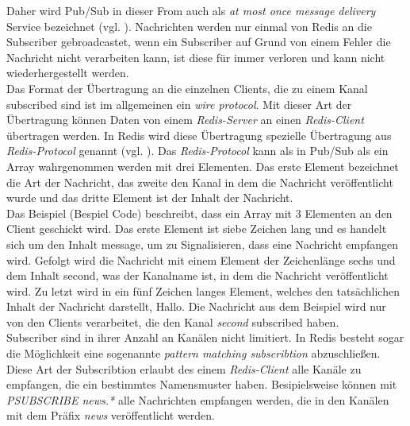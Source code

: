 Daher wird \acs{Pub/Sub} in dieser From auch als \textit{at most once message delivery} Service bezeichnet (vgl. \cite{Redis-PubSub}). Nachrichten werden nur einmal von \acs{Redis} an die Subscriber gebroadcastet, wenn ein Subscriber auf Grund von einem Fehler die Nachricht nicht verarbeiten kann, ist diese für immer verloren und kann nicht wiederhergestellt werden. 
\\
Das Format der Übertragung an die einzelnen Clients, die zu einem Kanal subscribed sind ist im allgemeinen ein \textit{wire protocol}. Mit dieser Art der Übertragung können Daten von einem \textit{Redis-Server} an einen \textit{Redis-Client} übertragen werden.
In \acs{Redis} wird diese Übertragung spezielle Übertragung aus \textit{Redis-Protocol} genannt (vgl. \cite{Redis-PubSub}).
Das \textit{Redis-Protocol} kann als in \acs{Pub/Sub} als ein Array wahrgenommen werden mit drei Elementen. Das erste Element bezeichnet die Art der Nachricht, das zweite den Kanal in dem die Nachricht veröffentlicht wurde und das dritte Element ist der Inhalt der Nachricht. 
\\
Das Beispiel (Bespiel Code) beschreibt, dass ein Array mit 3 Elementen an den Client geschickt wird. Das erste Element ist siebe Zeichen lang und es handelt sich um den Inhalt message, um zu Signalisieren, dass eine Nachricht empfangen wird. Gefolgt wird die Nachricht mit einem Element der Zeichenlänge sechs und dem Inhalt second, was der Kanalname ist, in dem die Nachricht veröffentlicht wird. Zu letzt wird in ein fünf Zeichen langes Element, welches den tatsächlichen Inhalt der Nachricht darstellt, \glqq Hallo\grqq.
Die Nachricht aus dem Beispiel wird nur von den Clients verarbeitet, die den Kanal \textit{second} subscribed haben.
\\
Subscriber sind in ihrer Anzahl an Kanälen nicht limitiert. In \acs{Redis} besteht sogar die Möglichkeit eine sogenannte \textit{pattern matching subscribtion} abzuschließen. Diese Art der Subscribtion erlaubt des einem \textit{Redis-Client} alle Kanäle zu empfangen, die ein bestimmtes Namensmuster haben. Besipielsweise können mit \textit{PSUBSCRIBE news.*} alle Nachrichten empfangen werden, die in den Kanälen mit dem Präfix \textit{news} veröffentlicht werden.